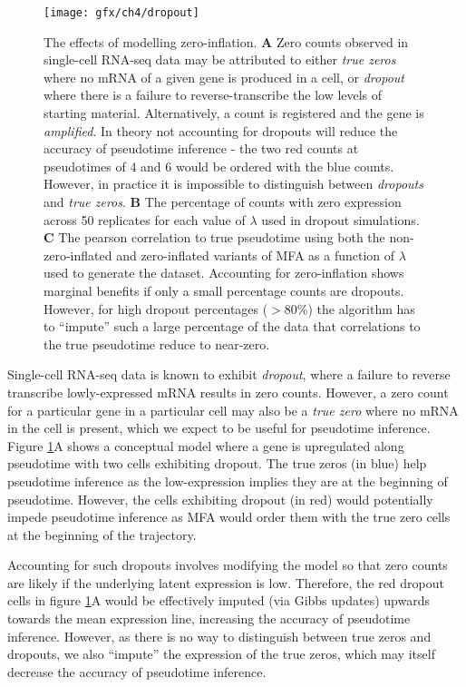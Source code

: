 \begin{figure}
	\centering
	\texttt{[image: gfx/ch4/dropout]}
	\caption[The effects of modelling zero-inflation.]{The effects of modelling zero-inflation. {\normalfont
\textbf{A} Zero counts observed in single-cell RNA-seq data may be attributed to either \emph{true zeros} where no mRNA of a given gene is produced in a cell, or \emph{dropout} where there is a failure to reverse-transcribe the low levels of starting material. Alternatively, a count is registered and the gene is \emph{amplified}. In theory not accounting for dropouts will reduce the accuracy of pseudotime inference - the two red counts at pseudotimes of 4 and 6 would be ordered with the blue counts. However, in practice it is impossible to distinguish between \emph{dropouts} and \emph{true zeros}.
\textbf{B} The percentage of counts with zero expression across 50 replicates for each value of $\lambda$ used in dropout simulations.
\textbf{C} The pearson correlation to true pseudotime using both the non-zero-inflated and zero-inflated variants of MFA as a function of $\lambda$ used to generate the dataset. Accounting for zero-inflation shows marginal benefits if only a small percentage counts are dropouts. However, for high dropout percentages ($>80\%$) the algorithm has to ``impute'' such a large percentage of the data that correlations to the true pseudotime reduce to near-zero.
	}} \label{fig:dropout_results}
\end{figure}

Single-cell RNA-seq data is known to exhibit \emph{dropout}, where a failure to reverse transcribe lowly-expressed mRNA results in zero counts. %
However, a zero count for a particular gene in a particular cell may also be a \emph{true zero} where no mRNA in the cell is present, which we expect to be useful for pseudotime inference. Figure \ref{fig:dropout_results}A shows a conceptual model where a gene is upregulated along pseudotime with two cells exhibiting dropout. The true zeros (in blue) help pseudotime inference as the low-expression implies they are at the beginning of pseudotime. However, the cells exhibiting dropout (in red) would potentially impede pseudotime inference as MFA would order them with the true zero cells at the beginning of the trajectory.

Accounting for such dropouts involves modifying the model so that zero counts are likely if the underlying latent expression is low. Therefore, the red dropout cells in figure \ref{fig:dropout_results}A would be effectively imputed (via Gibbs updates) upwards towards the mean expression line, increasing the accuracy of pseudotime inference. However, as there is no way to distinguish between true zeros and dropouts, we also ``impute'' the expression of the true zeros, which may itself decrease the accuracy of pseudotime inference.

